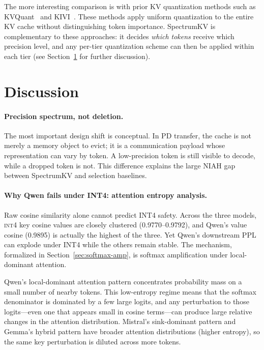\documentclass[11pt]{article}
\newcommand{\method}{SpectrumKV}
\newcommand{\niah}{NIAH}
\newcommand{\intiv}{\textsc{int4}}
\theoremstyle{plain}
\theoremstyle{definition}
\begin{document}
The more interesting comparison is with prior KV quantization methods such as KVQuant~\citep{kvquant} and KIVI~\citep{kivi}.  These methods apply uniform quantization to the entire KV cache without distinguishing token importance.  \method{} is complementary to these approaches: it decides \emph{which tokens} receive which precision level, and any per-tier quantization scheme can then be applied within each tier (see Section~\ref{sec:discussion} for further discussion).

\section{Discussion}
\label{sec:discussion}

\paragraph{Precision spectrum, not deletion.}
The most important design shift is conceptual.  In PD transfer, the cache is not merely a memory object to evict; it is a communication payload whose representation can vary by token.  A low-precision token is still visible to decode, while a dropped token is not.  This difference explains the large \niah{} gap between \method{} and selection baselines.

\paragraph{Why Qwen fails under INT4: attention entropy analysis.}
Raw cosine similarity alone cannot predict INT4 safety.  Across the three models, \intiv{} key cosine values are closely clustered (0.9770--0.9792), and Qwen's value cosine (0.9895) is actually the highest of the three.  Yet Qwen's downstream PPL can explode under INT4 while the others remain stable.  The mechanism, formalized in Section~\ref{sec:softmax-amp}, is softmax amplification under local-dominant attention.

Qwen's local-dominant attention pattern concentrates probability mass on a small number of nearby tokens.  This low-entropy regime means that the softmax denominator is dominated by a few large logits, and any perturbation to those logits---even one that appears small in cosine terms---can produce large relative changes in the attention distribution.  Mistral's sink-dominant pattern and Gemma's hybrid pattern have broader attention distributions (higher entropy), so the same key perturbation is diluted across more tokens.
\end{document}
